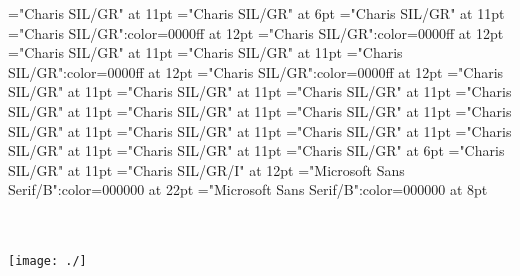 \documentclass[a4paper,twoside]{article}
\begin{document}
\font\LinebscrSectioncolumnsscrBookscrBody="Charis SIL/GR" at 11pt
\font\VerseNumberzxxLinebscrSectioncolumnsscrBookscrBody="Charis SIL/GR" at 6pt
\font\spanzxxLinebscrSectioncolumnsscrBookscrBody="Charis SIL/GR" at 11pt
\font\SeeInGlossaryzxxLinebscrSectioncolumnsscrBookscrBody="Charis SIL/GR":color=0000ff at 12pt
\font\GlossaryKeySeeInGlossaryzxxLinebscrSectioncolumnsscrBookscrBody="Charis SIL/GR":color=0000ff at 12pt
\font\LinecscrSectioncolumnsscrBookscrBody="Charis SIL/GR" at 11pt
\font\spanzxxLinecscrSectioncolumnsscrBookscrBody="Charis SIL/GR" at 11pt
\font\SeeInGlossaryzxxParagraphscrSectioncolumnsscrBookscrBody="Charis SIL/GR":color=0000ff at 12pt
\font\GlossaryKeySeeInGlossaryzxxParagraphscrSectioncolumnsscrBookscrBody="Charis SIL/GR":color=0000ff at 12pt
\font\picturePageParagraphscrSectioncolumnsscrBookscrBody="Charis SIL/GR" at 11pt
\font\picturepicturePageParagraphscrSectioncolumnsscrBookscrBody="Charis SIL/GR" at 11pt
\font\pictureCaptionpicturePageParagraphscrSectioncolumnsscrBookscrBody="Charis SIL/GR" at 11pt
\font\spanzxxpictureCaptionpicturePageParagraphscrSectioncolumnsscrBookscrBody="Charis SIL/GR" at 11pt
\font{}="Charis SIL/GR" at 11pt
\font\pictureColumnParagraphscrSectioncolumnsscrBookscrBody="Charis SIL/GR" at 11pt
\font\picturepictureColumnParagraphscrSectioncolumnsscrBookscrBody="Charis SIL/GR" at 11pt
\font\pictureCaptionpictureColumnParagraphscrSectioncolumnsscrBookscrBody="Charis SIL/GR" at 11pt
\font\spanzxxpictureCaptionpictureColumnParagraphscrSectioncolumnsscrBookscrBody="Charis SIL/GR" at 11pt
\font{}="Charis SIL/GR" at 11pt
\font\ParagraphContinuationscrSectioncolumnsscrBookscrBody="Charis SIL/GR" at 11pt
\font\VerseNumberzxxParagraphContinuationscrSectioncolumnsscrBookscrBody="Charis SIL/GR" at 6pt
\font\spanzxxParagraphContinuationscrSectioncolumnsscrBookscrBody="Charis SIL/GR" at 11pt
\font\AlternateReadingzxxNoteGeneralParagraphParagraphscrSectioncolumnsscrBookscrBody="Charis SIL/GR/I" at 12pt
\color{black} 
\thispagestyle{empty} 
\font\CoverPageTitle="Microsoft Sans Serif/B":color=000000 at 22pt 
\font\pFrontMatterdiv="Microsoft Sans Serif/B":color=000000 at 8pt 
\vskip 60pt 
\begin{center} 
\end{center} 
\newpage 
\newpage 
\thispagestyle{empty} 
\mbox{} 
\begin{titlepage}
\begin{center}
\textsc{\LARGE {}}\\[1.5cm] 
\vspace{110 mm} 
\textsc{ }\\[0.5cm] 
\texttt{[image: ./]}\\[1cm]    
\end{center} 
\end{titlepage} 
\setcounter{page}{3} 
 
\pagestyle{plain} 
\newpage 
\end{document}
